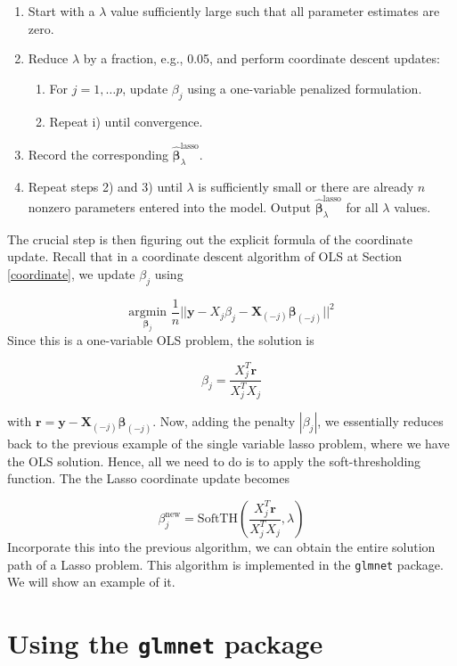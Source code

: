 \documentclass[
]{book}
\providecommand{\tightlist}{%
  \setlength{\itemsep}{0pt}\setlength{\parskip}{0pt}}
\theoremstyle{definition}
\theoremstyle{definition}
\theoremstyle{definition}
\theoremstyle{definition}
\theoremstyle{remark}
\begin{document}
\begin{enumerate}
\def\labelenumi{\arabic{enumi})}
\tightlist
\item
  Start with a \(\lambda\) value sufficiently large such that all parameter estimates are zero.
\item
  Reduce \(\lambda\) by a fraction, e.g., 0.05, and perform coordinate descent updates:

  \begin{enumerate}
  \def\labelenumii{\roman{enumii})}
  \tightlist
  \item
    For \(j = 1, \ldots p\), update \(\beta_j\) using a one-variable penalized formulation.
  \item
    Repeat i) until convergence.
  \end{enumerate}
\item
  Record the corresponding \(\widehat{\boldsymbol \beta}^\text{lasso}_\lambda\).
\item
  Repeat steps 2) and 3) until \(\lambda\) is sufficiently small or there are already \(n\) nonzero parameters entered into the model. Output \(\widehat{\boldsymbol \beta}^\text{lasso}_\lambda\) for all \(\lambda\) values.
\end{enumerate}

The crucial step is then figuring out the explicit formula of the coordinate update. Recall that in a coordinate descent algorithm of OLS at Section \ref{coordinate}, we update \(\beta_j\) using

\[
\underset{\boldsymbol \beta_j}{\text{argmin}} \,\, \frac{1}{n} ||\mathbf{y}- X_j \beta_j - \mathbf{X}_{(-j)} \boldsymbol \beta_{(-j)} ||^2
\]
Since this is a one-variable OLS problem, the solution is

\[
\beta_j = \frac{X_j^T \mathbf{r}}{X_j^T X_j}
\]

with \(\mathbf{r}= \mathbf{y}- \mathbf{X}_{(-j)} \boldsymbol \beta_{(-j)}\). Now, adding the penalty \(|\beta_j|\), we essentially reduces back to the previous example of the single variable lasso problem, where we have the OLS solution. Hence, all we need to do is to apply the soft-thresholding function. The the Lasso coordinate update becomes

\[\beta_j^\text{new} = \text{SoftTH}\left(\frac{X_j^T \mathbf{r}}{X_j^T X_j}, \lambda\right) \]
Incorporate this into the previous algorithm, we can obtain the entire solution path of a Lasso problem. This algorithm is implemented in the \texttt{glmnet} package. We will show an example of it.

\hypertarget{using-the-glmnet-package}{%
\section{\texorpdfstring{Using the \texttt{glmnet} package}{Using the glmnet package}}\label{using-the-glmnet-package}}
\end{document}
